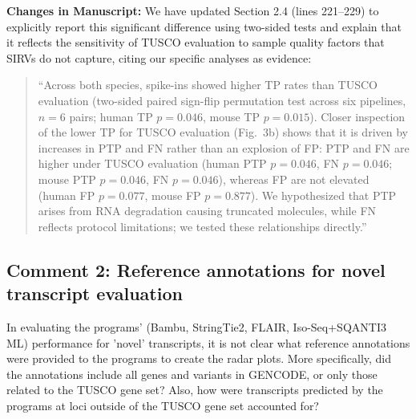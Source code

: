 \documentclass[11pt]{article}
\newcommand{\tuscoEvaluation}{TUSCO evaluation}
\begin{document}
\begin{responseboxnew}
\vspace{0.3cm}
\textbf{Changes in Manuscript:} We have updated Section 2.4 (lines 221--229) to explicitly report this significant difference using two-sided tests and explain that it reflects the sensitivity of TUSCO evaluation to sample quality factors that SIRVs do not capture, citing our specific analyses as evidence:
\begin{quote}
``Across both species, spike-ins showed higher TP rates than \tuscoEvaluation{} (two-sided paired sign-flip permutation test across six pipelines, $n=6$ pairs; human TP $p=0.046$, mouse TP $p=0.015$). Closer inspection of the lower TP for \tuscoEvaluation{} (Fig.~3b) shows that it is driven by increases in PTP and FN rather than an explosion of FP: PTP and FN are higher under \tuscoEvaluation{} (human PTP $p=0.046$, FN $p=0.046$; mouse PTP $p=0.046$, FN $p=0.046$), whereas FP are not elevated (human FP $p=0.077$, mouse FP $p=0.877$). We hypothesized that PTP arises from RNA degradation causing truncated molecules, while FN reflects protocol limitations; we tested these relationships directly.''
\end{quote}
\end{responseboxnew}

\subsection{Comment 2: Reference annotations for novel transcript evaluation}

\begin{reviewercomment}
In evaluating the programs' (Bambu, StringTie2, FLAIR, Iso-Seq+SQANTI3 ML) performance for 'novel' transcripts, it is not clear what reference annotations were provided to the programs to create the radar plots. More specifically, did the annotations include all genes and variants in GENCODE, or only those related to the TUSCO gene set? Also, how were transcripts predicted by the programs at loci outside of the TUSCO gene set accounted for?
\end{reviewercomment}
\end{document}
